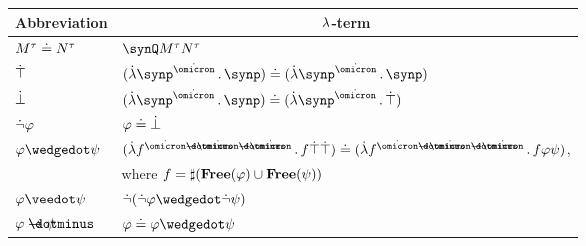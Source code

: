 \begin{definition}
  \begin{table}
    \begin{center}
      \begin{tabular}{l l}
        \toprule
        \multicolumn{1}{c}{Abbreviation} & \multicolumn{1}{c}{\( {\mathrm \lambda} \)-term}                                                                                                                                                                \\
        \midrule
        \( M^\tau \doteq N^\tau \)       & \( \synQ M^\tau N^\tau \)                                                                                                                                                                                \\
        \( \dot{\top} \)                    & \( (\qabs {\synp^{\syn\omicron}} \synp) \syneq (\qabs {\synp^{\syn\omicron}} \synp) \)                                                                                                                   \\
        \( \dot{\bot} \)                    & \( (\qabs {\synp^{\syn\omicron}} \synp) \syneq (\qabs {\synp^{\syn\omicron}} \syntop) \)                                                                                                                 \\
        \( \dot{\neg} \varphi \)            & \( \varphi \doteq \dot{\bot} \)                                                                                                                                                                             \\
        \( \varphi \synwedge \psi \)     & \( (\qabs {f^{\syn\omicron \synimplies \syn\omicron \synimplies \syn\omicron}} f \syntop \syntop) \syneq (\qabs {f^{\syn\omicron \synimplies \syn\omicron \synimplies \syn\omicron}} f \varphi \psi) \), \\
                                         & \quad where \( f = \sharp(\op*{Free}(\varphi) \cup \op*{Free}(\psi)) \)                                                                                                                                  \\
        \( \varphi \synvee \psi \)       & \( \synneg (\synneg \varphi \synwedge \synneg \psi) \)                                                                                                                                                   \\
        \( \varphi \synimplies \psi \)   & \( \varphi \syneq \varphi \synwedge \psi \)                                                                                                                                                              \\

\end{tabular}
\end{center}
\end{table}
\end{definition}

